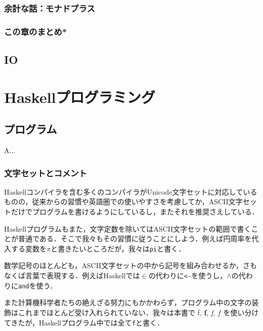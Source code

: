 \documentclass[a4paper]{jsbook}
\newcommand{\programminglanguage}[1]{\textsf{#1}}
\newcommand{\haskell}{\programminglanguage{Haskell}}
\newenvironment{leader}{\begingroup}{\endgroup}
\newcommand{\code}[1]{\texttt{#1}}
\begin{document}

\section{余計な話：モナドプラス}
\section*{この章のまとめ*}

\chapter{IO}
\part{\haskell プログラミング}

\chapter{プログラム}

\begin{leader}
A...
\end{leader}


\section{文字セットとコメント}

\haskell コンパイラを含む多くのコンパイラがUnicode文字セットに対応しているものの，従来からの習慣や英語圏での使いやすさを考慮してか，ASCII文字セットだけでプログラムを書けるようにしているし，またそれを推奨さえしている．

\haskell プログラムもまた，文字定数を除いてはASCII文字セットの範囲で書くことが普通である．そこで我々もその習慣に従うことにしよう．例えば円周率を代入する変数を$\pi$と書きたいところだが，我々は\code{pi}と書く．

数学記号のほとんども，ASCII文字セットの中から記号を組み合わせるか，さもなくば言葉で表現する．例えば\haskell では$\in$の代わりに\code{<-}を使うし，$\wedge$の代わりに\code{and}を使う．

また計算機科学者たちの絶えざる努力にもかかわらず，プログラム中の文字の装飾はこれまでほとんど受け入れられていない．我々は本書で \textrm{f}, \textbf{f}, \textit{f}, $f$ を使い分けてきたが，\haskell プログラム中では全て\code{f}と書く．
\end{document}
